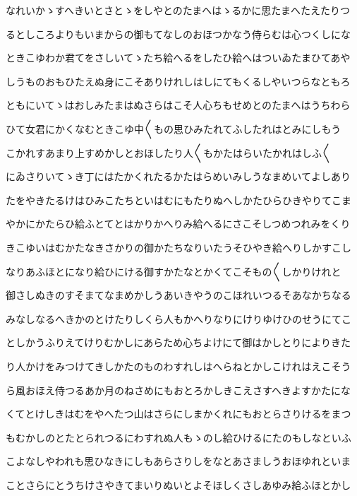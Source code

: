 \documentclass[a4paper,11pt,landscape]{ltjtarticle}
\begin{document}
\par\medskip
なれいかゝすへきいとさとゝをしやとのたまへはゝるかに思たまへたえたりつ
\par\medskip
るとしころよりもいまからの御もてなしのおほつかなう侍らむは心つくしにな
\par\medskip
ときこゆわか君てをさしいてゝたち給へるをしたひ給へはついゐたまひてあや
\par\medskip
しうものおもひたえぬ身にこそありけれしはしにてもくるしやいつらなともろ
\par\medskip
ともにいてゝはおしみたまはぬさらはこそ人心ちもせめとのたまへはうちわら
\par\medskip
ひて女君にかくなむときこゆ中〱もの思ひみたれてふしたれはとみにしもう
\par\medskip
こかれすあまり上すめかしとおほしたり人〱もかたはらいたかれはしふ〱
\par\medskip
にゐさりいてゝき丁にはたかくれたるかたはらめいみしうなまめいてよしあり
\par\medskip
たをやきたるけはひみこたちといはむにもたりぬへしかたひらひきやりてこま
\par\medskip
やかにかたらひ給ふとてとはかりかへりみ給へるにさこそしつめつれみをくり
\par\medskip
きこゆいはむかたなきさかりの御かたちなりいたうそひやき給へりしかすこし
\par\medskip
なりあふほとになり給ひにける御すかたなとかくてこそもの〱しかりけれと
\par\medskip
御さしぬきのすそまてなまめかしうあいきやうのこほれいつるそあなかちなる
\par\medskip
みなしなるへきかのとけたりしくら人もかへりなりにけりゆけひのせうにてこ
\par\medskip
としかうふりえてけりむかしにあらため心ちよけにて御はかしとりによりきた
\par\medskip
り人かけをみつけてきしかたのものわすれしはへらねとかしこけれはえこそう
\par\medskip
ら風おほえ侍つるあか月のねさめにもおとろかしきこえさすへきよすかたにな
\par\medskip
くてとけしきはむをやへたつ山はさらにしまかくれにもおとらさりけるをまつ
\par\medskip
もむかしのとたとられつるにわすれぬ人もゝのし給ひけるにたのもしなといふ
\par\medskip
こよなしやわれも思ひなきにしもあらさりしをなとあさましうおほゆれといま
\par\medskip
ことさらにとうちけさやきてまいりぬいとよそほしくさしあゆみ給ふほとかし
\par\medskip
\end{document}
